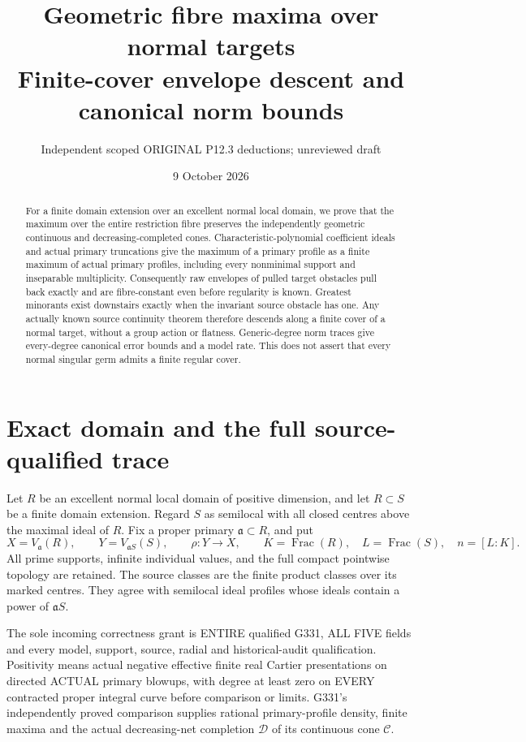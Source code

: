 \documentclass[11pt]{article}
\title{Geometric fibre maxima over normal targets\\
Finite-cover envelope descent and canonical norm bounds}
\author{Independent scoped ORIGINAL P12.3 deductions; unreviewed draft}
\date{9 October 2026}
\newcommand{\C}{\mathcal C}
\newcommand{\D}{\mathcal D}
\newcommand{\aa}{\mathfrak a}
\begin{document}
\maketitle
\begin{abstract}
For a finite domain extension over an excellent normal local domain, we
prove that the maximum over the entire restriction fibre preserves the
independently geometric continuous and decreasing-completed cones.
Characteristic-polynomial coefficient ideals and actual primary
truncations give the maximum of a primary profile as a finite maximum
of actual primary profiles, including every nonminimal support and
inseparable multiplicity. Consequently raw envelopes of pulled target
obstacles pull back exactly and are fibre-constant even before regularity
is known. Greatest minorants exist downstairs exactly when the invariant
source obstacle has one. Any actually known source continuity theorem
therefore descends along a finite cover of a normal target, without a
group action or flatness. Generic-degree norm traces give every-degree
canonical error bounds and a model rate. This does not assert that every
normal singular germ admits a finite regular cover.
\end{abstract}

\section{Exact domain and the full source-qualified trace}
Let $R$ be an excellent normal local domain of positive dimension, and
let $R\subset S$ be a finite domain extension. Regard $S$ as semilocal
with all closed centres above the maximal ideal of $R$. Fix a proper
primary $\aa\subset R$, and put
\[
 X=V_\aa(R),\qquad Y=V_{\aa S}(S),\qquad \rho:Y\to X,\qquad
 K=\operatorname{Frac}(R),\quad L=\operatorname{Frac}(S),\quad n=[L:K].
\]
All prime supports, infinite individual values, and the full compact
pointwise topology are retained. The source classes are the finite product
classes over its marked centres. They agree with semilocal ideal profiles
whose ideals contain a power of $\aa S$.

The sole incoming correctness grant is ENTIRE qualified G331, ALL FIVE
fields and every model, support, source, radial and historical-audit
qualification. Positivity means actual negative effective finite real
Cartier presentations on directed ACTUAL primary blowups, with degree
at least zero on EVERY contracted proper integral curve before comparison
or limits. G331's independently proved comparison supplies rational
primary-profile density, finite maxima and the actual decreasing-net
completion $\D$ of its continuous cone $\C$.
\end{document}
